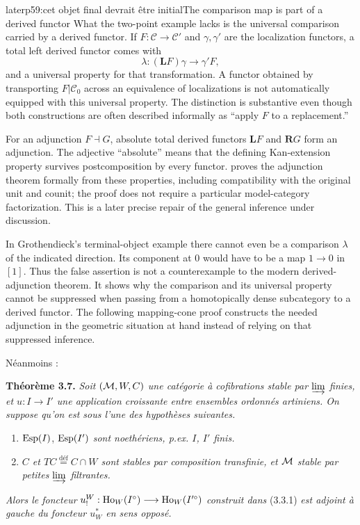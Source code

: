 \begin{dcomment}{later}{p59:cet objet final devrait être initial}{The comparison map is part of a derived functor}
What the two-point example lacks is the universal comparison carried by a derived functor. If $F:\mathcal C\to\mathcal C'$ and $\gamma,\gamma'$ are the localization functors, a total left derived functor comes with
\[
 \lambda:(\mathbf L F)\gamma\longrightarrow\gamma'F,
\]
and a universal property for that transformation. A functor obtained by transporting $F|\mathcal C_0$ across an equivalence of localizations is not automatically equipped with this universal property. The distinction is substantive even though both constructions are often described informally as ``apply $F$ to a replacement.''

For an adjunction $F\dashv G$, absolute total derived functors $\mathbf L F$ and $\mathbf R G$ form an adjunction. The adjective ``absolute'' means that the defining Kan-extension property survives postcomposition by every functor. \citet{Maltsiniotis2007Adjunction} proves the adjunction theorem formally from these properties, including compatibility with the original unit and counit; the proof does not require a particular model-category factorization. This is a later precise repair of the general inference under discussion.

In Grothendieck's terminal-object example there cannot even be a comparison $\lambda$ of the indicated direction. Its component at $0$ would have to be a map $1\to0$ in $[1]$. Thus the false assertion is not a counterexample to the modern derived-adjunction theorem. It shows why the comparison and its universal property cannot be suppressed when passing from a homotopically dense subcategory to a derived functor. The following mapping-cone proof constructs the needed adjunction in the geometric situation at hand instead of relying on that suppressed inference.
\end{dcomment}


Néanmoins :

\textbf{Théorème 3.7.} \textit{Soit $(\mathcal{M},W,C)$ une catégorie à cofibrations stable par $\varinjlim$ finies, et $u : I \longrightarrow I'$ une application croissante entre ensembles ordonnés artiniens. On suppose qu'on est sous l'une des hypothèses suivantes.}
\begin{enumerate}
\item[a)] $\operatorname{Esp}(I)$, $\operatorname{Esp}(I')$ \textit{sont noethériens, p.ex. $I$, $I'$ finis.}

\item[b)] \textit{$C$ et $TC \overset{\text{déf}}{=} C\cap W$ sont stables par composition transfinie, et $\mathcal{M}$ stable par petites $\varinjlim$ filtrantes.}
\end{enumerate}
\textit{Alors le foncteur} $u_!^W : \operatorname{Ho}_W(I^\circ) \longrightarrow \operatorname{Ho}_W(I'^\circ)$ \textit{construit dans} (3.3.1) \textit{est adjoint à gauche du foncteur $u_W^*$ en sens opposé.}

